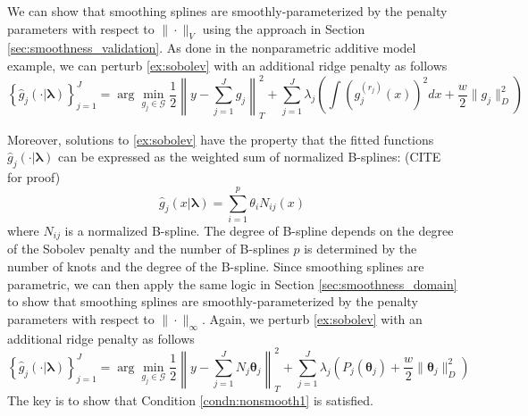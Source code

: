 \documentclass[12pt]{article}
\begin{document}
We can show that smoothing splines are smoothly-parameterized by the penalty parameters with respect to $\|\cdot\|_V$ using the approach in Section \ref{sec:smoothness_validation}. As done in the nonparametric additive model example, we can perturb \eqref{ex:sobolev} with an additional ridge penalty as follows
\begin{equation}
\label{eq:sobolev_nonparam_ridge}
\left \{ \hat{g}_j(\cdot | \boldsymbol \lambda) \right \}_{j=1}^J =
\arg\min_{g_j\in\mathcal{G}}
\frac{1}{2} \left \|y- \sum_{j=1}^J g_j \right \|_{T}^{2}
+ \sum_{j=1}^J \lambda_j 
\left (
\int \left (g_j^{(r_j)}(x) \right )^2 dx
+ \frac{w}{2} \|g_j\|^2_D
\right )
\end{equation}

Moreover, solutions to \eqref{ex:sobolev} have the property that the fitted functions $\hat{g}_j(\cdot | \boldsymbol \lambda)$ can be expressed as the weighted sum of normalized B-splines: (CITE for proof) 
\begin{equation}
\hat{g}_j(x | \boldsymbol \lambda) = \sum_{i=1}^{p} \theta_i N_{ij}(x)
\end{equation}
where $N_{ij}$ is a normalized B-spline. The degree of B-spline depends on the degree of the Sobolev penalty and the number of B-splines $p$ is determined by the number of knots and the degree of the B-spline.
Since smoothing splines are parametric, we can then apply the same logic in Section \ref{sec:smoothness_domain} to show that smoothing splines are smoothly-parameterized by the penalty parameters with respect to $\|\cdot\|_\infty$. Again, we perturb \eqref{ex:sobolev} with an additional ridge penalty as follows
\begin{equation}
\label{eq:sobolev_param_ridge}
\left \{ \hat{g}_j(\cdot | \boldsymbol \lambda) \right \}_{j=1}^J =
\arg\min_{g_j\in\mathcal{G}}
\frac{1}{2} \left \|y- \sum_{j=1}^J N_j \boldsymbol{\theta}_j \right \|_{T}^{2}
+ \sum_{j=1}^J \lambda_j 
\left (
P_j(\boldsymbol{\theta}_j)
+ \frac{w}{2} \| \boldsymbol{\theta}_j \|^2_D
\right )
\end{equation}
The key is to show that Condition \ref{condn:nonsmooth1} is satisfied. 
\end{document}
